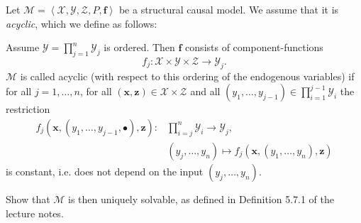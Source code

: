 Let $\mathcal{M} = \left\langle \boldsymbol{\mathcal{X}}, \boldsymbol{\mathcal{Y}}, \boldsymbol{\mathcal{Z}}, P, \boldsymbol{f}\right\rangle$ be a structural causal model.
We assume that it is \emph{acyclic}, which we define as follows:

Assume $\boldsymbol{\mathcal{Y}} = \prod_{j = 1}^{n} \mathcal{Y}_j$ is ordered. 
Then $\boldsymbol{f}$ consists of component-functions
\begin{equation*}
  f_j: \boldsymbol{\mathcal{X}} \times \boldsymbol{\mathcal{Y}} \times \boldsymbol{\mathcal{Z}} \to \mathcal{Y}_j.
  \label{eq:component_functions}
\end{equation*}
$\mathcal{M}$ is called acyclic (with respect to this ordering of the endogenous variables) if for all $j = 1, \dots, n$, for all $(\boldsymbol{x}, \boldsymbol{z}) \in \boldsymbol{\mathcal{X}} \times \boldsymbol{\mathcal{Z}}$ and all $(y_1, \dots, y_{j-1}) \in \prod_{i = 1}^{j-1} \mathcal{Y}_i$ the restriction
\begin{align*}
  f_j(\boldsymbol{x}, (y_1, \dots, y_{j-1}, \bullet), \boldsymbol{z}): & \prod_{i = j}^{n} \mathcal{Y}_i \to \mathcal{Y}_j, \\
  &  (y_{j}, \dots, y_n) \mapsto f_j(\boldsymbol{x}, (y_1, \dots, y_n), \boldsymbol{z})
  \label{eqn:def_acyclic}
\end{align*}
is constant, i.e. does not depend on the input $(y_{j}, \dots, y_n)$.

Show that $\mathcal{M}$ is then uniquely solvable, as defined in Definition 5.7.1 of the lecture notes.
\begin{gradedsolution}
\end{gradedsolution}
